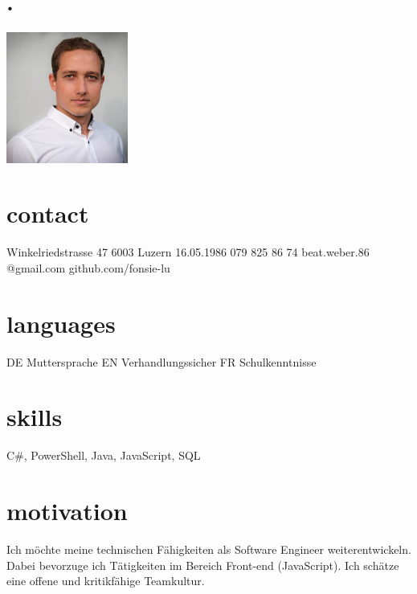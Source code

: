 \documentclass[]{cv-style} %
\begin{document}
\begin{aside}
\section{.}
\includegraphics[width=4cm]{portrait}
\section{contact}
Winkelriedstrasse 47
6003 Luzern
\vspace{0.5cm}16.05.1986
\vspace{0.5cm}079 825 86 74
\vspace{0.2cm}beat.weber.86
@gmail.com
\vspace{0.2cm}github.com/fonsie-lu
\section{languages}
DE
Muttersprache
EN
Verhandlungssicher 
FR
Schulkenntnisse
\section{skills}
C\#, PowerShell, Java, JavaScript, SQL
\end{aside}
\section{motivation}
Ich möchte meine technischen Fähigkeiten als Software Engineer weiterentwickeln. Dabei bevorzuge ich Tätigkeiten im Bereich Front-end (JavaScript). Ich schätze eine offene und kritikfähige Teamkultur.
\end{document}
